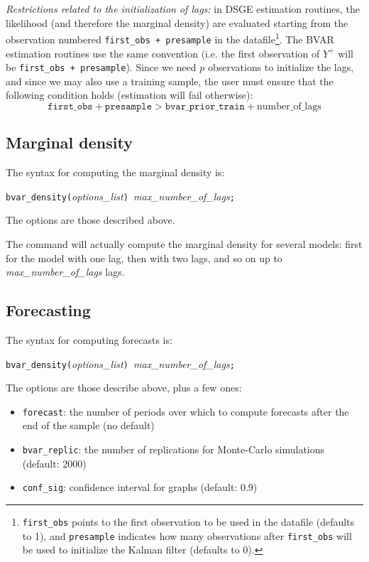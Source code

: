 \documentclass[10pt,a4paper]{article}
\begin{document}
\emph{Restrictions related to the initialization of lags:} in DSGE estimation routines, the likelihood (and therefore the marginal density) are evaluated starting from the observation numbered \texttt{first\_obs + presample} in the datafile\footnote{\texttt{first\_obs} points to the first observation to be used in the datafile (defaults to 1), and \texttt{presample} indicates how many observations after \texttt{first\_obs} will be used to initialize the Kalman filter (defaults to 0).}. The BVAR estimation routines use the same convention (i.e. the first observation of $Y^+$ will be \texttt{first\_obs + presample}). Since we need $p$ observations to initialize the lags, and since we may also use a training sample, the user must ensure that the following condition holds (estimation will fail otherwise):
$$\texttt{first\_obs} + \texttt{presample} > \texttt{bvar\_prior\_train} + \text{number\_of\_lags}$$



\subsection{Marginal density}

The syntax for computing the marginal density is:

\medskip
\texttt{bvar\_density(}\textit{options\_list}\texttt{) }\textit{max\_number\_of\_lags}\texttt{;}
\medskip

The options are those described above.

The command will actually compute the marginal density for several models: first for the model with one lag, then with two lags, and so on up to \textit{max\_number\_of\_lags} lags.

\subsection{Forecasting}

The syntax for computing forecasts is:

\medskip
\texttt{bvar\_density(}\textit{options\_list}\texttt{) }\textit{max\_number\_of\_lags}\texttt{;}
\medskip

The options are those describe above, plus a few ones:
\begin{itemize}
\item \texttt{forecast}: the number of periods over which to compute forecasts after the end of the sample (no default)
\item \texttt{bvar\_replic}: the number of replications for Monte-Carlo simulations (default: 2000)
\item \texttt{conf\_sig}: confidence interval for graphs (default: 0.9)
\end{itemize}
\end{document}
